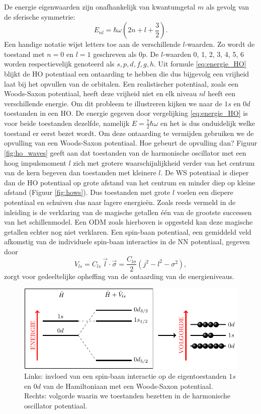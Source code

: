 \documentclass[11pt,twoside]{book}
\begin{document}
De energie eigenwaarden zijn onafhankelijk van kwantumgetal $m$ als gevolg van de sferische symmetrie:
\begin{equation} \label{eq:energie_HO}
E_{nl} = \hbar \omega \left(2n+ l + \frac{3}{2} \right).
\end{equation} 
Een handige notatie wijst letters toe aan de verschillende $l$-waarden. Zo wordt de toestand met $n = 0$ en $l = 1$ geschreven als $0p$. De $l$-waarden 0, 1, 2, 3, 4, 5, 6 worden respectievelijk genoteerd als $s,p,d,f,g,h$.
Uit formule \eqref{eq:energie_HO} blijkt de HO potentiaal een ontaarding te hebben die dus bijgevolg een vrijheid laat bij het opvullen van de orbitalen. Een realistischer potentiaal, zoals een Woods-Saxon potentiaal, heeft deze vrijheid niet en elk niveau $nl$ heeft een verschillende energie. Om dit probleem te illustreren kijken we naar de $1s$ en $0d$ toestanden in een HO. De energie gegeven door vergelijking \eqref{eq:energie_HO} is voor beide toestanden dezelfde, namelijk $E = \frac{7}{2} \hbar\omega$ en het is dus onduidelijk welke toestand er eerst bezet wordt. Om deze ontaarding te vermijden gebruiken we de opvulling van een Woods-Saxon potentiaal. Hoe gebeurt de opvulling dan?  Figuur \ref{fig:ho_waves} geeft aan dat toestanden van de harmonische oscillator met een hoog impulsmoment $l$ zich met grotere waarschijnlijkheid verder van het centrum van de kern begeven dan toestanden met kleinere $l$. De WS potentiaal is dieper dan de HO potentiaal op grote afstand van het centrum en minder diep op kleine afstand (Figuur \ref{fig:hows}). Dus toestanden met grote $l$ voelen een diepere potentiaal en schuiven dus naar lagere energie\"{e}n. 
Zoals reeds vermeld in de inleiding is de verklaring van de magische getallen \'{e}\'{e}n van de grootste successen van het schillenmodel. Een ODM zoals hierboven is opgesteld kan deze magische getallen echter nog niet verklaren. Een  spin-baan potentiaal, een gemiddeld veld afkomstig van de individuele spin-baan interacties in de NN potentiaal, gegeven door
\begin{equation}
V_{ls} = C_{ls}\  \vec{l} \cdot \vec{\sigma} =  \frac{ C_{l\sigma}}{2} \left( j^2 - l^2 - \sigma^2 \right),
\end{equation}
zorgt voor gedeeltelijke opheffing van de ontaarding van de energieniveaus. 
\begin{figure}
\centering
\includegraphics[scale=1]{./figuren/opvulling}
\caption{Links: invloed van een spin-baan interactie op de eigentoestanden $1s$ en $0d$ van de Hamiltoniaan met een Woods-Saxon potentiaal. Rechts: volgorde waarin we toestanden bezetten in de harmonische oscillator potentiaal.}
\label{fig:spin_orbit}
\end{figure}
\end{document}
